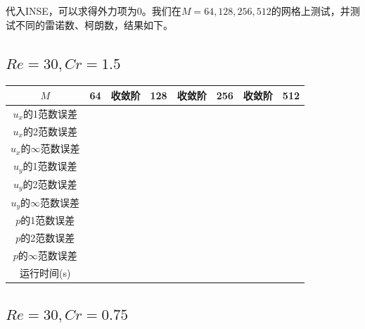 \documentclass[lang=cn,10pt,bibend=bibtex]{elegantbook}
\begin{document}
代入INSE，可以求得外力项为0。我们在$M=64,128,256,512$的网格上测试，并测试不同的雷诺数、柯朗数，结果如下。

\subsection{$Re=30,Cr=1.5$}

\begin{table}[H]
  \centering
  \small
  \begin{tabular}{c|ccccccc}
  \textbf{$M$}              & 64          & 收敛阶 & 128         & 收敛阶 & 256         & 收敛阶 & 512   \\ \hline
  $u_x$的1范数误差                  &  &   &  &   &  &   &  \\
  $u_x$的2范数误差                  &  &   &  &   &  &   &  \\
  $u_x$的$\infty$范数误差           &  &   &  &   &  &   &  \\
  $u_y$的1范数误差                  &  &   &  &   &  &   &  \\
  $u_y$的2范数误差                  &  &   &  &   &  &   &  \\
  $u_y$的$\infty$范数误差           &  &   &  &   &  &   &  \\
  $p$的1范数误差                  &  &   &  &   &  &   &  \\
  $p$的2范数误差                  &  &   &  &   &  &   &  \\
  $p$的$\infty$范数误差           &  &   &  &   &  &   &  \\
  运行时间(s)                &            &       &           &       &          &       & 
  \end{tabular}
\end{table}

\subsection{$Re=30,Cr=0.75$}
\end{document}
